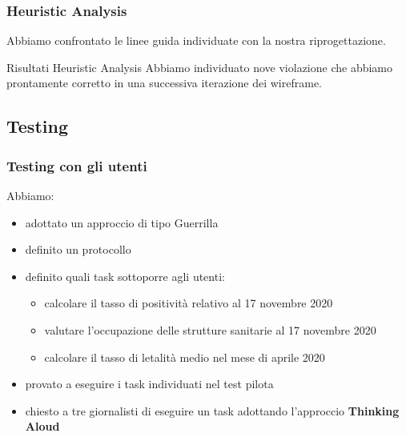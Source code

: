 \documentclass[handout]{beamer}
\begin{document}
		\begin{frame}
			\frametitle{Heuristic Analysis}
			Abbiamo confrontato le linee guida individuate con la nostra riprogettazione. \newline \newline
			\begin{block}{Risultati Heuristic Analysis}
				Abbiamo individuato nove violazione che abbiamo prontamente corretto in una successiva iterazione dei wireframe.
		\end{block}
		\end{frame}

		\subsection{Testing}
		\begin{frame}
			\frametitle{Testing con gli utenti}
			Abbiamo:
			\begin{itemize}[<+->]
				\item adottato un approccio di tipo Guerrilla\\ 
				\item definito un protocollo\\
				\item definito quali task sottoporre agli utenti:
					\begin{itemize}[<+->]
						\item calcolare il tasso di positività relativo al 17 novembre 2020\\
						\item valutare l'occupazione delle strutture sanitarie al 17 novembre 2020\\
						\item calcolare il tasso di letalità medio nel mese di aprile 2020\\
					\end{itemize}
				\item provato a eseguire i task individuati nel test pilota\\
				\item chiesto a tre giornalisti di eseguire un task adottando l'approccio \textbf{Thinking Aloud}\\
			\end{itemize}
		\end{frame}
\end{document}
